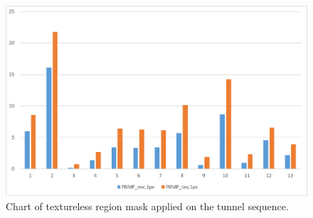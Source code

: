 \begin{figure}[h!]
\centering
\includegraphics[width=1.0\textwidth]{src/images/evaluation/plots/05-tunnel-pbmp-tex-1.pdf}
\caption[Chart of textureless region mask]{Chart of textureless region mask applied on the tunnel sequence.}
\label{fig:eval-plots-pbmp-tex1}
\end{figure}

